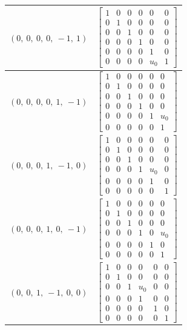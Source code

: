 \documentclass[11pt]{article}
\theoremstyle{definition}
\begin{document}
\begin{longtable}{|l|c|}
    \hline
    $\left( 0, \  0, \  0, \  0, \  -1, \  1\right)$ & ${\left[\begin{matrix}1 & 0 & 0 & 0 & 0 & 0\\0 & 1 & 0 & 0 & 0 & 0\\0 & 0 & 1 & 0 & 0 & 0\\0 & 0 & 0 & 1 & 0 & 0\\0 & 0 & 0 & 0 & 1 & 0\\0 & 0 & 0 & 0 & u_{0} & 1\end{matrix}\right]}$ \\
    \hline
    $\left( 0, \  0, \  0, \  0, \  1, \  -1\right)$ & ${\left[\begin{matrix}1 & 0 & 0 & 0 & 0 & 0\\0 & 1 & 0 & 0 & 0 & 0\\0 & 0 & 1 & 0 & 0 & 0\\0 & 0 & 0 & 1 & 0 & 0\\0 & 0 & 0 & 0 & 1 & u_{0}\\0 & 0 & 0 & 0 & 0 & 1\end{matrix}\right]}$ \\
    \hline
    $\left( 0, \  0, \  0, \  1, \  -1, \  0\right)$ & ${\left[\begin{matrix}1 & 0 & 0 & 0 & 0 & 0\\0 & 1 & 0 & 0 & 0 & 0\\0 & 0 & 1 & 0 & 0 & 0\\0 & 0 & 0 & 1 & u_{0} & 0\\0 & 0 & 0 & 0 & 1 & 0\\0 & 0 & 0 & 0 & 0 & 1\end{matrix}\right]}$ \\
    \hline
    $\left( 0, \  0, \  0, \  1, \  0, \  -1\right)$ & ${\left[\begin{matrix}1 & 0 & 0 & 0 & 0 & 0\\0 & 1 & 0 & 0 & 0 & 0\\0 & 0 & 1 & 0 & 0 & 0\\0 & 0 & 0 & 1 & 0 & u_{0}\\0 & 0 & 0 & 0 & 1 & 0\\0 & 0 & 0 & 0 & 0 & 1\end{matrix}\right]}$ \\
    \hline
    $\left( 0, \  0, \  1, \  -1, \  0, \  0\right)$ & ${\left[\begin{matrix}1 & 0 & 0 & 0 & 0 & 0\\0 & 1 & 0 & 0 & 0 & 0\\0 & 0 & 1 & u_{0} & 0 & 0\\0 & 0 & 0 & 1 & 0 & 0\\0 & 0 & 0 & 0 & 1 & 0\\0 & 0 & 0 & 0 & 0 & 1\end{matrix}\right]}$ \\

\end{longtable}
\end{document}

